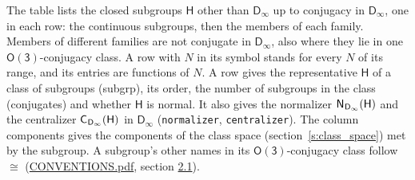 \documentclass[10pt,a4paper]{article}
\numberwithin{equation}{section}
\newcommand{\grp}[1]{\mathsf{#1}}
\newcommand{\samecls}{\cong}
\newcommand{\hairsp}{\mkern1mu}
\begin{document}
\leavevmode\label{n:group.H}The table lists the closed subgroups $\grp{H}$ other than $\grp{D_{\infty}}$ up to conjugacy in $\grp{D_{\infty}}$, one in each row: the continuous subgroups, then the members of each family. Members of different families are not conjugate in $\grp{D_{\infty}}$, also where they lie in one \href{O3.pdf}{$\grp{O(3)}$}-conjugacy class. A row with $N$ in its symbol stands for every $N$ of its range, and its entries are functions of $N$. \label{n:head.subgroup}\label{n:head.order}\label{n:head.conjugates}\label{n:head.normal}A row gives the representative $\grp{H}$ of a class of subgroups (subgrp), its order, the number of subgroups in the class (conjugates) and whether $\grp{H}$ is normal. \label{n:group.normalizer}\label{n:group.centralizer}It also gives the normalizer $\grp{N}_{\hairsp \grp{D_{\infty}}}(\grp{H})$ and the centralizer $\grp{C}_{\hairsp \grp{D_{\infty}}}(\grp{H})$ in $\grp{D_{\infty}}$ (\texttt{normalizer}, \texttt{centralizer}). \label{n:head.components}The column components gives the components of the class space (section~\ref{s:class_space}) met by the subgroup. A subgroup's other names in its \href{O3.pdf}{$\grp{O(3)}$}-conjugacy class follow $\samecls$ (\href{../../CONVENTIONS.pdf}{CONVENTIONS.pdf}, section \href{../../CONVENTIONS.pdf\#conv.2.1}{2.1}).
\end{document}
